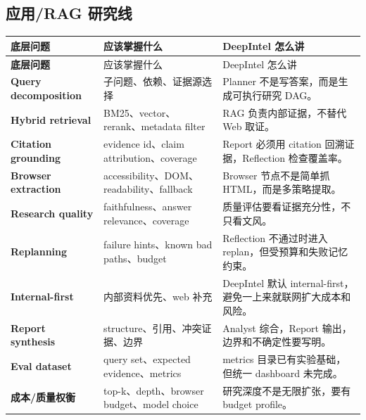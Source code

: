 \subsection{应用/RAG 研究线}
\begin{longtable}{>{\bfseries}p{}p{}p{}}
\toprule
底层问题 & 应该掌握什么 & DeepIntel 怎么讲 \\
\midrule
\endfirsthead
\toprule
底层问题 & 应该掌握什么 & DeepIntel 怎么讲 \\
\midrule
\endhead
Query decomposition & 子问题、依赖、证据源选择 & Planner 不是写答案，而是生成可执行研究 DAG。 \\
Hybrid retrieval & BM25、vector、rerank、metadata filter & RAG 负责内部证据，不替代 Web 取证。 \\
Citation grounding & evidence id、claim attribution、coverage & Report 必须用 citation 回溯证据，Reflection 检查覆盖率。 \\
Browser extraction & accessibility、DOM、readability、fallback & Browser 节点不是简单抓 HTML，而是多策略提取。 \\
Research quality & faithfulness、answer relevance、coverage & 质量评估要看证据充分性，不只看文风。 \\
Replanning & failure hints、known bad paths、budget & Reflection 不通过时进入 replan，但受预算和失败记忆约束。 \\
Internal-first & 内部资料优先、web 补充 & DeepIntel 默认 internal-first，避免一上来就联网扩大成本和风险。 \\
Report synthesis & structure、引用、冲突证据、边界 & Analyst 综合，Report 输出，边界和不确定性要写明。 \\
Eval dataset & query set、expected evidence、metrics & metrics 目录已有实验基础，但统一 dashboard 未完成。 \\
成本/质量权衡 & top-k、depth、browser budget、model choice & 研究深度不是无限扩张，要有 budget profile。 \\
\bottomrule
\end{longtable}


